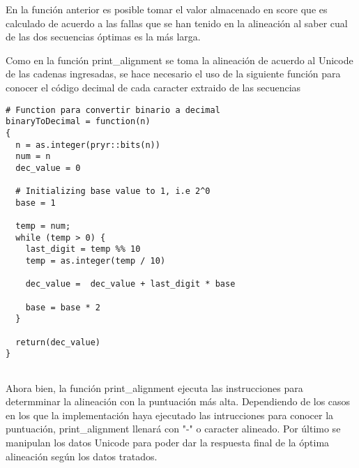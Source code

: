 \documentclass[usenatbib]{tjaa}
\begin{document}
En la función anterior es posible tomar el valor almacenado en score que es calculado de acuerdo a las fallas que se han tenido en la alineación al saber cual de las dos secuencias óptimas es la más larga.

Como en la función print\_alignment se toma la alineación de acuerdo al Unicode de las cadenas ingresadas, se hace necesario el uso de la siguiente función para conocer el código decimal de cada caracter extraido de las secuencias

\begin{verbatim}
# Function para convertir binario a decimal
binaryToDecimal = function(n)
{
  n = as.integer(pryr::bits(n))
  num = n
  dec_value = 0
  
  # Initializing base value to 1, i.e 2^0
  base = 1
  
  temp = num;
  while (temp > 0) {
    last_digit = temp %% 10
    temp = as.integer(temp / 10)
    
    dec_value =  dec_value + last_digit * base
    
    base = base * 2
  }
  
  return(dec_value)
}


\end{verbatim}
Ahora bien, la función print\_alignment ejecuta las instrucciones para determminar la alineación con la puntuación más alta. Dependiendo de los casos en los que la implementación haya ejecutado las intrucciones para conocer la puntuación, print\_alignment llenará con "-" o caracter alineado. Por último se manipulan los datos Unicode para poder dar la respuesta final de la óptima alineación según los datos tratados.
\end{document}
